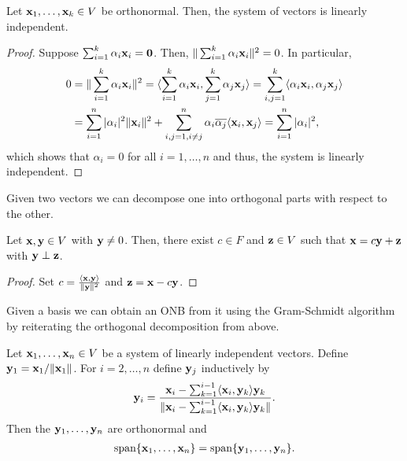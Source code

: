 \documentclass{article}
\begin{document}
\begin{proposition}
Let ${\mathbf{x}}_1,\ldots, {\mathbf{x}}_k\in V$ be orthonormal. Then, the system of vectors is linearly independent.
\end{proposition}

\begin{proof}
Suppose $\sum_{i=1}^k \alpha_i {\mathbf{x}}_i = {\mathbf{0}}$. Then, $\Vert \sum_{i=1}^k \alpha_i {\mathbf{x}}_i\Vert^2 = 0$. In particular,
\begin{align*}
    0 &= \Vert \sum_{i=1}^k \alpha_i {\mathbf{x}}_i\Vert^2 = \langle \sum_{i=1}^k \alpha_i {\mathbf{x}}_i, \sum_{j=1}^k \alpha_j {\mathbf{x}}_j \rangle = \sum_{i,j=1}^k\langle \alpha_i {\mathbf{x}}_i, \alpha_j {\mathbf{x}}_j \rangle \\
    &= \sum_{i=1}^n \vert \alpha_i \vert^2 \Vert {\mathbf{x}}_i \Vert^2 + \sum_{i,j=1, i\neq j}^n \alpha_i \overline{\alpha_j} \langle {\mathbf{x}}_i,{\mathbf{x}}_j \rangle =\sum_{i=1}^n \vert \alpha_i\vert^2,
\end{align*}
which shows that $\alpha_i = 0$ for all $i=1,\ldots, n$ and thus, the system is linearly independent. 
\end{proof}

Given two vectors we can decompose one into orthogonal parts with respect to the other. 

\begin{proposition}
Let ${\mathbf{x}},{\mathbf{y}}\in V$ with ${\mathbf{y}} \neq 0$. Then, there exist $c\in F$ and ${\mathbf{z}}\in V$ such that ${\mathbf{x}} = c{\mathbf{y}} + {\mathbf{z}}$ with ${\mathbf{y}} \perp {\mathbf{z}}$.
\end{proposition}

\begin{proof}
Set $c = \frac{\langle {\mathbf{x}},{\mathbf{y}} \rangle}{\Vert {\mathbf{y}} \Vert^2} $ and ${\mathbf{z}} = {\mathbf{x}} - c{\mathbf{y}}$.
\end{proof}

Given a basis we can obtain an ONB from it using the Gram-Schmidt algorithm by reiterating the orthogonal decomposition from above.

\begin{proposition}
Let ${\mathbf{x}}_1,\ldots, {\mathbf{x}}_n \in V$ be a system of linearly independent vectors. Define ${\mathbf{y}}_1 = {\mathbf{x}}_1/\Vert {\mathbf{x}}_1 \Vert$. For $i = 2,\ldots,n$ define ${\mathbf{y}}_j$ inductively by
\begin{align*}
    {\mathbf{y}}_i = \frac{{\mathbf{x}}_i-\sum_{k=1}^{i-1} \langle {\mathbf{x}}_i,{\mathbf{y}}_k \rangle{\mathbf{y}}_k}{\Vert {\mathbf{x}}_i-\sum_{k=1}^{i-1} \langle {\mathbf{x}}_i,{\mathbf{y}}_k \rangle{\mathbf{y}}_k\Vert}.
\end{align*}
Then the ${\mathbf{y}}_1, \ldots, {\mathbf{y}}_n$ are orthonormal and 
\begin{align*}
    \mathrm{span}\{{\mathbf{x}}_1,\ldots,{\mathbf{x}}_n\} = \mathrm{span}\{{\mathbf{y}}_1,\ldots,{\mathbf{y}}_n\}.
\end{align*}
\end{proposition}
\end{document}
